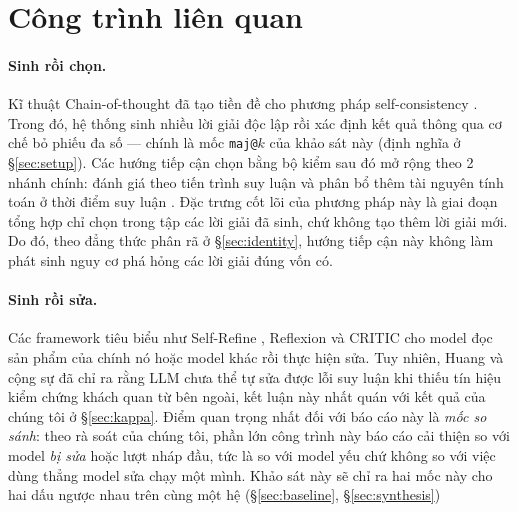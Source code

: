 \documentclass[11pt,a4paper]{article}
\begin{document}
\section{Công trình liên quan}\label{sec:related}

\paragraph{Sinh rồi chọn.} Kĩ thuật Chain-of-thought \cite{wei2022} đã tạo tiền đề cho phương pháp self-consistency
\cite{wang2023}. Trong đó, hệ thống sinh nhiều lời giải độc lập rồi xác định kết quả thông qua cơ chế bỏ phiếu đa số --- chính là mốc
\texttt{maj@}$k$ của khảo sát này (định nghĩa ở \S\ref{sec:setup}). Các hướng tiếp cận chọn bằng bộ kiểm sau đó mở rộng theo 2 nhánh chính: đánh giá theo tiến trình suy luận \cite{lightman2024} và phân bổ thêm tài nguyên tính toán ở thời điểm suy luận \cite{snell2024}. Đặc trưng cốt lõi của phương pháp này là giai đoạn tổng hợp chỉ chọn trong tập các lời giải đã sinh, chứ không tạo thêm lời
giải mới. Do đó, theo đẳng thức phân rã ở \S\ref{sec:identity}, hướng tiếp cận này không làm phát sinh nguy cơ phá hỏng các lời giải đúng vốn có.

\paragraph{Sinh rồi sửa.} Các framework tiêu biểu như Self-Refine \cite{madaan2023}, Reflexion \cite{shinn2023} và CRITIC
\cite{gou2024} cho model đọc sản phẩm của chính nó hoặc model khác rồi thực hiện sửa. Tuy nhiên, Huang và cộng sự
\cite{huang2024} đã chỉ ra rằng LLM chưa thể tự sửa được lỗi suy luận khi thiếu tín hiệu kiểm chứng khách quan từ bên ngoài, kết luận này nhất quán với
kết quả của chúng tôi ở \S\ref{sec:kappa}. Điểm quan trọng nhất đối với báo cáo này là \emph{mốc
so sánh}: theo rà soát của chúng tôi, phần lớn công trình này báo cáo cải thiện so với model
\emph{bị sửa} hoặc lượt nháp đầu, tức là so với model yếu chứ không so với việc dùng
thẳng model sửa chạy một mình. Khảo sát này sẽ chỉ ra hai mốc này cho hai dấu ngược nhau trên cùng một hệ (\S\ref{sec:baseline},
\S\ref{sec:synthesis})
\end{document}
